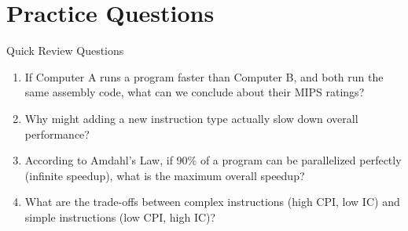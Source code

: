 \documentclass[aspectratio=169,12pt]{beamer}
\begin{document}
\section{Practice Questions}
\begin{frame}{Quick Review Questions}
\begin{enumerate}
    \item If Computer A runs a program faster than Computer B, and both run the same assembly code, what can we conclude about their MIPS ratings?

    \item Why might adding a new instruction type actually slow down overall performance?

    \item According to Amdahl's Law, if 90\% of a program can be parallelized perfectly (infinite speedup), what is the maximum overall speedup?

    \item What are the trade-offs between complex instructions (high CPI, low IC) and simple instructions (low CPI, high IC)?
\end{enumerate}
\end{frame}
\end{document}
